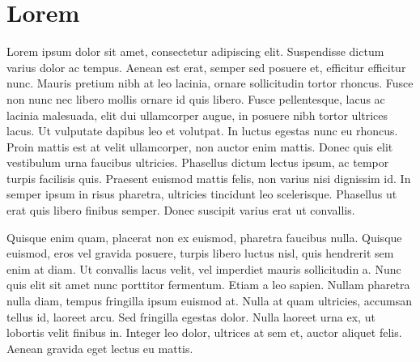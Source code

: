 

\chapter{Lorem}
\label{lorem:cha}

Lorem ipsum dolor sit amet, consectetur adipiscing elit. Suspendisse dictum varius dolor ac tempus. Aenean est erat, semper sed posuere et, efficitur efficitur nunc. Mauris pretium nibh at leo lacinia, ornare sollicitudin tortor rhoncus. Fusce non nunc nec libero mollis ornare id quis libero. Fusce pellentesque, lacus ac lacinia malesuada, elit dui ullamcorper augue, in posuere nibh tortor ultrices lacus. Ut vulputate dapibus leo et volutpat. In luctus egestas nunc eu rhoncus. Proin mattis est at velit ullamcorper, non auctor enim mattis. Donec quis elit vestibulum urna faucibus ultricies. Phasellus dictum lectus ipsum, ac tempor turpis facilisis quis. Praesent euismod mattis felis, non varius nisi dignissim id. In semper ipsum in risus pharetra, ultricies tincidunt leo scelerisque. Phasellus ut erat quis libero finibus semper. Donec suscipit varius erat ut convallis.

Quisque enim quam, placerat non ex euismod, pharetra faucibus nulla. Quisque euismod, eros vel gravida posuere, turpis libero luctus nisl, quis hendrerit sem enim at diam. Ut convallis lacus velit, vel imperdiet mauris sollicitudin a. Nunc quis elit sit amet nunc porttitor fermentum. Etiam a leo sapien. Nullam pharetra nulla diam, tempus fringilla ipsum euismod at. Nulla at quam ultricies, accumsan tellus id, laoreet arcu. Sed fringilla egestas dolor. Nulla laoreet urna ex, ut lobortis velit finibus in. Integer leo dolor, ultrices at sem et, auctor aliquet felis. Aenean gravida eget lectus eu mattis.

